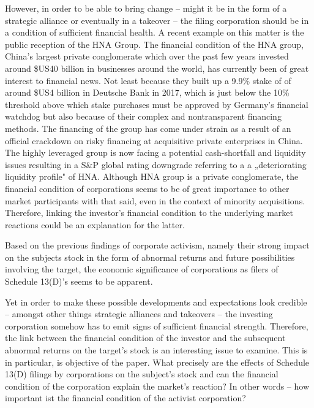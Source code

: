 \documentclass[12pt]{article}
\begin{document}
However, in order to be able to bring change -- might it be in the form of a strategic alliance or eventually in a takeover -- the filing corporation should be in a condition of sufficient financial health. 
A recent example on this matter is the public reception of the HNA Group. The financial condition of the HNA group, China's largest private conglomerate which over the past few years invested around \$US40 billion in businesses around the world, has currently been of great interest to financial news. Not least because they built up a 9.9\% stake of of around \$US4 billion in Deutsche Bank in 2017, which is just below the 10\% threshold above which stake purchases must be approved by Germany's financial watchdog but also because of their complex and nontransparent financing methods.
The financing of the group has come under strain as a result of an official crackdown on risky financing at acquisitive private enterprises in China. The highly leveraged group is now facing a potential cash-shortfall and liquidity issues resulting in a S\&P global rating downgrade referring to a a „deteriorating liquidity profile" of HNA. Although HNA group is a private conglomerate, the financial condition of corporations seems to be of great importance to other market participants with that said, even in the context of minority acquisitions. Therefore, linking the investor's financial condition to the underlying market reactions could be an explanation for the latter.


Based on the previous findings of corporate activism, namely their strong impact on the subjects stock in the form of abnormal returns and future possibilities involving the target, the economic significance of corporations as filers of Schedule 13(D)'s seems to be apparent.

Yet in order to make these possible developments and expectations look credible -- amongst other things strategic alliances and takeovers -- the investing corporation somehow has to emit signs of sufficient financial strength. Therefore, the link between the financial condition of the investor and the subsequent abnormal returns on the target's stock is an interesting issue to examine. This is in particular, is objective of the paper. What precisely are the effects of Schedule 13(D) filings by corporations on the subject's stock and can the financial condition of the corporation explain the market's reaction? In other words -- how important ist the financial condition of the activist corporation? 
\end{document}

